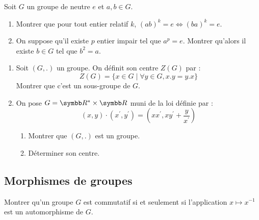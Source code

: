 \begin{exercice}
    Soit $G$ un groupe de neutre $e$ et $a,b\in G$.
    \begin{enumerate}
        \item Montrer que pour tout entier relatif $k$, $(ab)^{k}=e\iff(ba)^{k}=e$.
        \item On suppose qu'il existe $p$ entier impair tel que $a^{p}=e$. Montrer qu'alors il existe $b\in G$ tel que $b^{2}=a$.
    \end{enumerate}
\end{exercice}

\begin{exercice}
\begin{enumerate}
    \item Soit $(G,.)$ un groupe. On définit son centre $Z(G)$ par :
        \[Z(G)=\{x\in G \mid \forall y\in G, x.y=y.x\}\]
        Montrer que c'est un sous-groupe de $G$.
    \item On pose $G=\R^{*}\times\R$ muni de la loi définie par :
        \[(x,y) \cdot (x^{\prime},y^{\prime})=\left(xx^{\prime},xy^{\prime}+\frac{y}{x^{\prime}}\right)\]
        \begin{enumerate}
            \item Montrer que $(G,.)$ est un groupe.
            \item Déterminer son centre.
        \end{enumerate}
\end{enumerate}
\end{exercice}

\subsection{Morphismes de groupes}
\begin{exercice}
    Montrer qu'un groupe $G$ est commutatif si et seulement si l'application $x\mapsto x^{-1}$ est un automorphisme de $G$.
\end{exercice}

